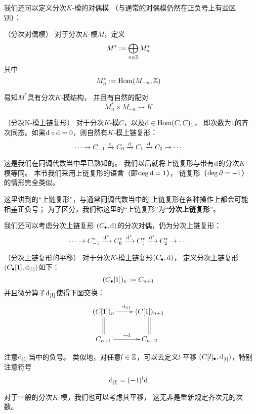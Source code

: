我们还可以定义分次$K$-模的对偶模
（与通常的对偶模仍然在正负号上有些区别）：

\begin{definition}（分次对偶模）
对于分次$K$-模$M$，定义
$$M^*:=\bigoplus_{n\in\mathbb{Z}}M^{*}_n$$
其中
$$M^*_n:=\operatorname{Hom}(M_{-n},\mathbb{Z})$$
\end{definition}
易知$M^*$具有分次$K$-模结构，
并且有自然的配对
$$M^*_n\times M_{-n}\to K$$


\begin{rem}（分次K-模上链复形）
对于分次$K$-模$C$，以及$\mathrm{d}\in\operatorname{Hom}(C,C)_1$，
即次数为$1$的齐次同态。如果$\mathrm{d}\circ\mathrm{d}=0$，则自然有$K$-模上链复形：
$$\cdots\to C_{-1}\xrightarrow{\mathrm{d}}C_0\xrightarrow{\mathrm{d}}C_1\xrightarrow{\mathrm{d}}C_2\to\cdots$$
\end{rem}
这是我们在同调代数当中早已熟知的。
我们以后就将上链复形与带有$\mathrm{d}$的分次$K$-模等同。
本节我们采用上链复形的语言（即$\deg\mathrm{d}=1$），
链复形（$\deg\partial=-1$）的情形完全类似。

这里讲到的“上链复形”，与通常同调代数当中的
上链复形在各种操作上都会可能相差正负号；
为了区分，我们称这里的“上链复形”为“\textbf{分次上链复形}”。

我们还可以考虑分次上链复形
$(C_{\bullet},\mathrm{d})$的分次对偶，仍为分次上链复形：
$$\cdots\to C_{-1}^*\xrightarrow{\mathrm{d}^*}C_0^*
\xrightarrow{\mathrm{d}^*}C_1^*\xrightarrow{\mathrm{d}^*}C_2^*\to\cdots$$


\begin{definition}（分次上链复形的平移）
对于分次$K$-模上链复形$(C_{\bullet},\mathrm{d})$，
定义分次上链复形
$(C_{\bullet}[1],\mathrm{d}_{[1]})$如下：
$$(C_{\bullet}[1])_n:=C_{n+1}$$
并且微分算子$\mathrm{d}_{[1]}$使得下图交换：
$$\xymatrix{
   (C[1])_n \ar[r]^{\td_{[1]}}  \ar@{=}[d]
  &(C[1])_{n+1}               \ar@{=}[d]
\\
   C_{n+1}  \ar[r]^{-\td}
  &C_{n+2}
}$$
\end{definition}
注意$\mathrm{d}_{[1]}$当中的负号。
类似地，对任意$l\in\mathbb{Z}$，可以去定义$l$-平移
$(C[l]_{\bullet},\mathrm{d}_{[l]})$，特别注意符号
$$\mathrm{d}_{[l]}=(-1)^l\mathrm{d}$$

对于一般的分次$K$-模，我们也可以考虑其平移，
这无非是重新规定齐次元的次数。


